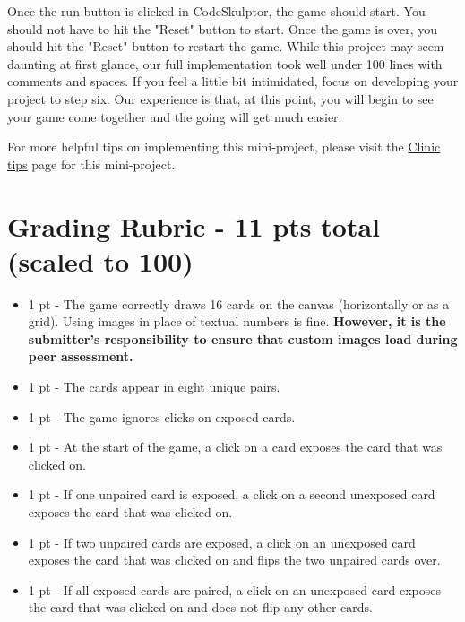 \documentclass[a4paper,10pt]{article}
\begin{document}
\begin{CJK}{UTF8}{gkai}
\begin{enumerate}
\end{enumerate}
\noindent Once the run button is clicked in CodeSkulptor, the game should start. You should not have to hit the "Reset" button to start. Once the game is over, you should hit the "Reset" button to restart the game. 
\noindent While this project may seem daunting at first glance, our full implementation took well under 100 lines with comments and spaces. If you feel a little bit intimidated, focus on developing your project to step six. Our experience is that, at this point, you will begin to see your game come together and the going will get much easier.

\noindent For more helpful tips on implementing this mini-project, please visit the \href{https://class.coursera.org/interactivepython2-010/wiki/memory_tipsCode }{Clinic tips} page for this mini-project.

\section*{Grading Rubric - 11 pts total (scaled to 100)}

\begin{itemize}



\item 1 pt - The game correctly draws 16 cards on the canvas (horizontally or as a grid). Using images in place of textual numbers is fine. \textbf{However, it is the submitter's responsibility to ensure that custom images load during peer assessment.}

\item 1 pt - The cards appear in eight unique pairs.

\item 1 pt - The game ignores clicks on exposed cards.

\item 1 pt - At the start of the game, a click on a card exposes the card that was clicked on.

\item 1 pt - If one unpaired card is exposed, a click on a second unexposed card exposes the card that was clicked on.

\item 1 pt - If two unpaired cards are exposed, a click on an unexposed card exposes the card that was clicked on and flips the two unpaired cards over.

\item 1 pt - If all exposed cards are paired, a click on an unexposed card exposes the card that was clicked on and does not flip any other cards.


\end{itemize}
\end{CJK}
\end{document}
